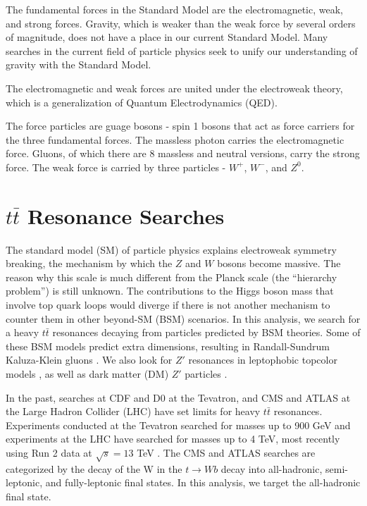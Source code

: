 The fundamental forces in the Standard Model are the electromagnetic, weak, and strong forces. Gravity, which is weaker than the weak force by several orders of magnitude, does not have a place in our current Standard Model. Many searches in the current field of particle physics seek to unify our understanding of gravity with the Standard Model. 

The electromagnetic and weak forces are united under the electroweak theory, which is a generalization of Quantum Electrodynamics (QED).

The force particles are guage bosons - spin 1 bosons that act as force carriers for the three fundamental forces. The massless photon carries the electromagnetic force. Gluons, of which there are 8 massless and neutral versions, carry the strong force. The weak force is carried by three particles - $W^+$, $W^-$, and $Z^0$. 

\newpage

\section{$t\bar{t}$ Resonance Searches}



The standard model (SM) of particle physics explains electroweak symmetry breaking, the mechanism by which the $Z$ and $W$ bosons become massive. The reason why this scale is much different from the Planck scale (the ``hierarchy problem'') is still unknown. The contributions to the Higgs boson mass that involve top quark loops would diverge if there is not another mechanism to counter them in other beyond-SM (BSM) scenarios. In this analysis, we search for a heavy  $t\bar{t}$ resonances decaying from particles predicted by BSM theories. Some of these BSM models predict extra dimensions, resulting in Randall-Sundrum Kaluza-Klein gluons \cite{ExtraDim}. We also look for $Z'$ resonances in leptophobic topcolor models \cite{leptophobicZprime, Zprimettxs, ZprimeCoupledtoGen3, WarpedGaugeBosons}, as well as dark matter (DM) $Z'$ particles \cite{wasmer_dark_matter}.

In the past, searches at CDF and D0 at the Tevatron, and CMS and ATLAS at the Large Hadron Collider (LHC) have set limits for heavy $t\bar{t}$ resonances. Experiments conducted at the Tevatron searched for masses up to 900 GeV \cite{cdftt3, d0tt} and experiments at the LHC have searched for masses up to 4 TeV, most recently using Run 2 data at $\sqrt{s} = 13$ TeV \cite{7tevZprime_CMSAllHad, 7tevZprime_CMSSemilept, 7tevZprime_ATLASAllHad, 7tevZprime_ATLASSemilept, 8tevZprime_CMSAllHad, 8tevZprime_CMSAllHadSemilept, 8tevZprime_CMSAllHadSemileptLept, 8tevZprime_ATLASSemilept, AN-2016-459}. The CMS and ATLAS searches are categorized by the decay of the W in the $t \rightarrow W b$ decay into all-hadronic, semi-leptonic, and fully-leptonic final states. In this analysis, we target the all-hadronic final state.

